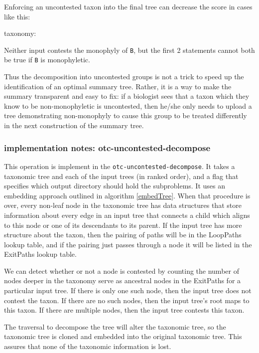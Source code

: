 \documentclass[11pt]{article}
\begin{document}
Enforcing an uncontested taxon into the final tree can decrease the score in cases like this:
\begin{compactenum}
\item {}
\item {}
\item taxonomy: 
\end{compactenum}
Neither input contests the monophyly of \texttt{B}, but the first 2 statements cannot 
    both be true if \texttt{B} is monophyletic.

Thus the decomposition into uncontested groups is not a trick to speed up
    the identification of an optimal summary tree.
Rather, it is a way to make the summary transparent and easy to fix:
    if a biologist sees that a taxon which they know to be non-monophyletic
    is uncontested, then he/she only needs to upload a tree demonstrating
    non-monophyly to cause this group to be treated differently in the next 
    construction of the summary tree.

\subsubsection{implementation notes: otc-uncontested-decompose}
This operation is implement in the {\tt otc-uncontested-decompose}.
It takes a taxonomic tree and each of the input trees (in ranked order), and a flag
    that specifies which output directory should hold the subproblems.
It uses an embedding approach outlined in algorithm \ref{embedTree}.
When that procedure is over, every non-leaf node in the taxonomic tree
    has data structures that store information about every edge in 
    an input tree that connects a child which aligns to this node or one of its descendants
    to its parent.
If the input tree has more structure about the taxon, then the pairing of paths will be in the 
    LoopPaths lookup table, and if the pairing just passes through a node it will be listed in
    the ExitPaths lookup table.

We can detect whether or not a node is contested by counting the number of nodes deeper in the 
    taxonomy serve as ancestral nodes in the ExitPaths for a particular input tree.
If there is only one such node, then the input tree does not contest the taxon.
If there are no such nodes, then the input tree's root maps to this taxon.
If there are multiple nodes, then the input tree contests this taxon.
\ProofWriteupNeeded

The traversal to decompose the tree will alter the taxonomic tree, so the taxonomic tree 
     is cloned and embedded into the original taxonomic tree.
This assures that none of the taxonomic information is lost.
\end{document}
